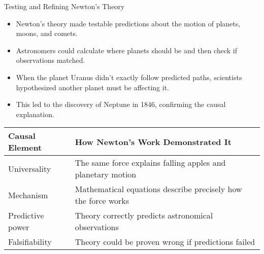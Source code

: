 \documentclass{beamer}
\begin{document}
\begin{frame}{Testing and Refining Newton's Theory}
    \begin{itemize}
        \item Newton's theory made testable predictions about the motion of planets, moons, and comets.
        \item Astronomers could calculate where planets should be and then check if observations matched.
        \item When the planet Uranus didn't exactly follow predicted paths, scientists hypothesized another planet must be affecting it.
        \item This led to the discovery of Neptune in 1846, confirming the causal explanation.
    \end{itemize}
    
    \begin{table}
        \small
        \centering
        \begin{tabular}{|l|p{8cm}|}
            \hline
            \textbf{Causal Element} & \textbf{How Newton's Work Demonstrated It} \\
            \hline
            Universality & The same force explains falling apples and planetary motion \\
            \hline
            Mechanism & Mathematical equations describe precisely how the force works \\
            \hline
            Predictive power & Theory correctly predicts astronomical observations \\
            \hline
            Falsifiability & Theory could be proven wrong if predictions failed \\
            \hline
        \end{tabular}
    \end{table}
\end{frame}
\end{document}
